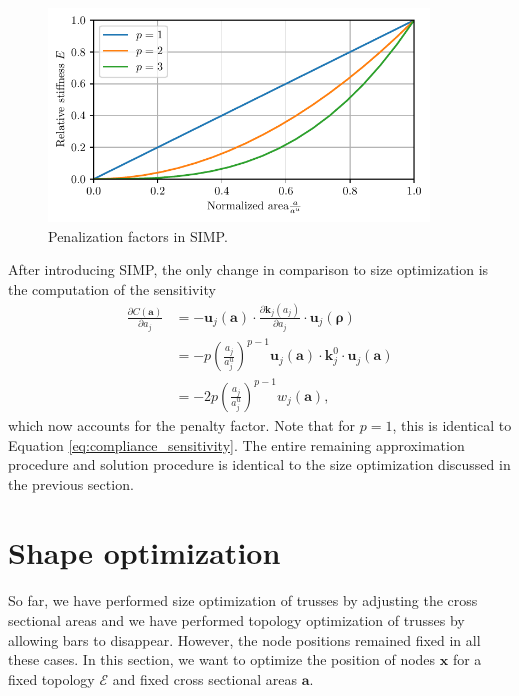 \begin{figure}[!htpb]
    \centering
    \includegraphics[width=0.9\textwidth]{figures/simp_truss.pdf}
    \caption{Penalization factors in SIMP.}
    \label{fig:simp_truss}
\end{figure}

After introducing SIMP, the only change in comparison to size optimization is the computation of the sensitivity
\begin{align}
    \frac{\partial C (\mathbf{a})}{\partial a_j} 
    &= - \mathbf{u}_j (\mathbf{a}) \cdot \frac{\partial \mathbf{k}_j(a_j)}{\partial a_j} \cdot \mathbf{u}_j (\pmb{\rho})  \\
    &= - p \left(\frac{a_j}{a_j^u}\right)^{p-1} \mathbf{u}_j (\mathbf{a}) \cdot \mathbf{k}^0_j \cdot \mathbf{u}_j (\mathbf{a})  \\
    &= - 2 p \left(\frac{a_j}{a_j^u}\right)^{p-1} w_j (\mathbf{a}),
\end{align}
which now accounts for the penalty factor. Note that for $p=1$, this is identical to Equation \eqref{eq:compliance_sensitivity}. 
The entire remaining approximation procedure and solution procedure is identical to the size optimization discussed in the previous section.

\section{Shape optimization}
So far, we have performed size optimization of trusses by adjusting the cross sectional areas and we have performed topology optimization of trusses by allowing bars to disappear. However, the node positions remained fixed in all these cases. 
In this section, we want to optimize the position of nodes $\mathbf{x}$ for a fixed topology $\mathcal{E}$ and fixed cross sectional areas $\mathbf{a}$.

